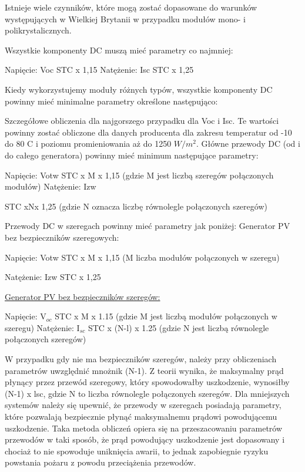 \documentclass[12pt,a4paper]{article}
\begin{document}
Istnieje wiele czynników, które mogą zostać dopasowane do warunków 
występujących w Wielkiej Brytanii w przypadku modułów mono- i 
polikrystalicznych. 

Wszystkie komponenty DC muszą mieć parametry co najmniej: 

Napięcie: Voc STC x 1,15 Natężenie: Isc STC x 1,25 

Kiedy wykorzystujemy moduły różnych typów, wszystkie komponenty DC 
powinny mieć minimalne parametry określone następująco: 

Szczegółowe obliczenia dla najgorszego przypadku dla Voc i Isc. Te 
wartości powinny zostać 
obliczone dla danych producenta 
dla zakresu temperatur od -10 do 
80 \degree C i poziomu promieniowania 
aż do 1250 ${W/m^{2}}$. 
Główne przewody DC (od i do całego generatora) powinny mieć minimum 
następujące parametry: 

Napięcie: Votw STC x M x 1,15 (gdzie M jest liczbą szeregów połączonych 
modułów) Natężenie: Izw 

STC xNx 1,25 (gdzie N oznacza liczbę równolegle połączonych szeregów) 

Przewody DC w szeregach powinny mieć parametry jak poniżej: Generator PV 
bez bezpieczników szeregowych: 

 

Napięcie: Votw STC x M x 1,15 (M liczba modułów połączonych w szeregu) 

Natężenie: Izw STC x 1,25 

\underline{Generator PV bez bezpieczników szeregów:} 

Napięcie: V$_{oc}$ STC x M x 1.15 (gdzie M jest liczbą modułów 
połączonych w szeregu) Natężenie: I$_{sc}$ STC x (N-l) x 1.25 (gdzie 
N jest liczbą równolegle połączonych szeregów) 

W przypadku gdy nie ma bezpieczników szeregów, należy przy obliczeniach 
parametrów uwzględnić mnożnik (N-1). Z teorii wynika, że maksymalny prąd 
płynący przez przewód szeregowy, który spowodowałby uszkodzenie, 
wynosiłby (N-1) x lsc, gdzie N to liczba równolegle połączonych 
szeregów. Dla mniejszych systemów należy się upewnić, że przewody w 
szeregach posiadają parametry, które pozwalają bezpiecznie płynąć 
maksymalnemu prądowi powodującemu uszkodzenie. Taka metoda obliczeń 
opiera się na przeszacowaniu parametrów przewodów w taki sposób, że prąd 
powodujący uszkodzenie jest dopasowany i chociaż to nie spowoduje 
uniknięcia awarii, to jednak zapobiegnie ryzyku powstania pożaru z 
powodu przeciążenia przewodów. 
\end{document}

